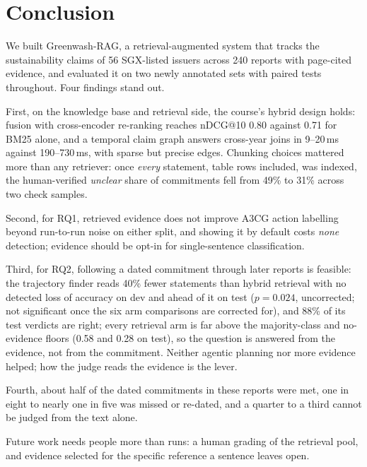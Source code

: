 \documentclass[11pt]{article}
\begin{document}
\section{Conclusion}
\label{sec:conclusion}
We built Greenwash-RAG, a retrieval-augmented system that tracks the sustainability claims of 56 SGX-listed issuers across 240 reports with page-cited evidence, and evaluated it on two newly annotated sets with paired tests throughout. Four findings stand out.

First, on the knowledge base and retrieval side, the course's hybrid design holds: fusion with cross-encoder re-ranking reaches nDCG@10 0.80 against 0.71 for BM25 alone, and a temporal claim graph answers cross-year joins in 9--20\,ms against 190--730\,ms, with sparse but precise edges. Chunking choices mattered more than any retriever: once \emph{every} statement, table rows included, was indexed, the human-verified \emph{unclear} share of commitments fell from 49\% to 31\% across two check samples.

Second, for RQ1, retrieved evidence does not improve A3CG action labelling beyond run-to-run noise on either split, and showing it by default costs \emph{none} detection; evidence should be opt-in for single-sentence classification.

Third, for RQ2, following a dated commitment through later reports is feasible: the trajectory finder reads 40\% fewer statements than hybrid retrieval with no detected loss of accuracy on dev and ahead of it on test ($p = 0.024$, uncorrected; not significant once the six arm comparisons are corrected for), and 88\% of its test verdicts are right; every retrieval arm is far above the majority-class and no-evidence floors (0.58 and 0.28 on test), so the question is answered from the evidence, not from the commitment. Neither agentic planning nor more evidence helped; how the judge reads the evidence is the lever.

Fourth, about half of the dated commitments in these reports were met, one in eight to nearly one in five was missed or re-dated, and a quarter to a third cannot be judged from the text alone.

Future work needs people more than runs: a human grading of the retrieval pool, and evidence selected for the specific reference a sentence leaves open.

\clearpage


\clearpage
\onecolumn
\makeatletter
\setlength\@fptop{0pt}
\setlength{}
\setlength{}
\makeatother
\setlength{\textfloatsep}{14pt plus 2pt}
\setlength{\floatsep}{14pt plus 2pt}
\renewcommand{\topfraction}{0.9}
\renewcommand{\bottomfraction}{0.8}
\renewcommand{\textfraction}{0.05}
\renewcommand{\floatpagefraction}{0.85}
\appendix
\end{document}
